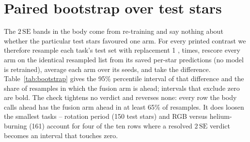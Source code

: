 \documentclass{article}
\providecommand{\DIFaddtex}[1]{{\protect\color{blue} \sf #1}} %
\providecommand{\DIFaddend}{} %
\providecommand{\DIFaddFL}[1]{\DIFadd{#1}} %
\providecommand{\DIFadd}[1]{\texorpdfstring{\DIFaddtex{#1}}{#1}} %
\DeclareRobustCommand{\DIFaddend}{\DIFOaddend \let\includegraphics\DIFOincludegraphics} %
\begin{document}
\section{\DIFadd{Paired bootstrap over test stars}}
\label{app:bootstrap}

\DIFadd{The $2\,\mathrm{SE}$ bands in the body come from re-training and say nothing about whether the
particular test stars favoured one arm. For every printed contrast we therefore resample each task's
test set with replacement 1}{\DIFadd{,}}\DIFadd{000 times, rescore every arm on the identical resampled list from its
saved per-star predictions (no model is retrained), average each arm over its seeds, and take the
difference. Table~\ref{tab:bootstrap} gives the 95\% percentile interval of that difference and the
share of resamples in which the fusion arm is ahead; intervals that exclude zero are bold. The check
tightens no verdict and reverses none: every row the body calls ahead has the fusion arm ahead in at
least 65\% of resamples. It does loosen the smallest tasks -- rotation period (150 test stars) and
RGB versus helium-burning (161) account for four of the ten rows where a resolved $2\,\mathrm{SE}$
verdict becomes an interval that touches zero.
}

\begin{table}[H]
\centering
\footnotesize
\setlength{\tabcolsep}{3.5pt}

\caption{\DIFaddFL{Paired star-bootstrap of the four contrasts the body counts. Each entry is the 95\% interval
of (left arm $-$ right arm) over 1}{\DIFaddFL{,}}\DIFaddFL{000 resamples of the test stars, seeds averaged, and the share of
resamples with the difference above zero. Bold: interval excludes zero.}}
\label{tab:bootstrap}
\end{table}
\DIFaddend 
\end{document}
